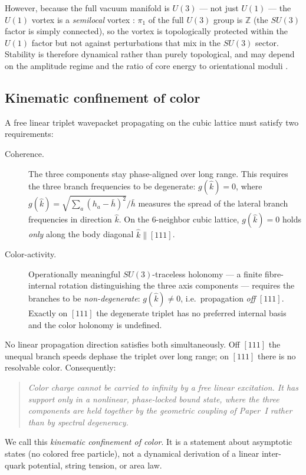 However, because the full vacuum manifold is $U(3)$ --- not just $U(1)$ --- the $U(1)$ vortex is a
\emph{semilocal} vortex \citep{VachaspatiAchucarro1991Semilocal,AchucarroVachaspati2000}: $\pi_1$ of
the full $U(3)$ group is $\mathbb{Z}$ (the $SU(3)$ factor is simply connected), so the vortex is
topologically protected within the $U(1)$ factor but not against perturbations that mix in the $SU(3)$
sector.
Stability is therefore dynamical rather than purely topological, and may depend on the amplitude regime
and the ratio of core energy to orientational moduli
\citep{AuzziBolognesiEvslinKonishiYung2003,Eto2021OrientationalModuli}.

\subsection{Kinematic confinement of color}
\label{subsec:color-confinement}

A free linear triplet wavepacket propagating on the cubic lattice must satisfy two requirements:
\begin{description}
  \item[\normalfont Coherence.] The three components stay phase-aligned over long range.
  This requires the three branch frequencies to be degenerate: $g(\hat k)=0$, where
  $g(\hat k)=\sqrt{\sum_a(h_a-\bar h)^2}/\bar h$ measures the spread of the lateral branch
  frequencies in direction $\hat k$.
  On the 6-neighbor cubic lattice, $g(\hat k)=0$ holds \emph{only} along the body diagonal
  $\hat k\parallel[111]$.

  \item[\normalfont Color-activity.] Operationally meaningful $SU(3)$-traceless holonomy ---
  a finite fibre-internal rotation distinguishing the three axis components --- requires the branches
  to be \emph{non-degenerate}: $g(\hat k)\neq 0$, i.e.\ propagation \emph{off} $[111]$.
  Exactly on $[111]$ the degenerate triplet has no preferred internal basis and the color holonomy is
  undefined.
\end{description}

No linear propagation direction satisfies both simultaneously.
Off $[111]$ the unequal branch speeds dephase the triplet over long range; on $[111]$ there is no
resolvable color.
Consequently:
\begin{quote}
  \emph{Color charge cannot be carried to infinity by a free linear excitation.
  It has support only in a nonlinear, phase-locked bound state, where the three components are held
  together by the geometric coupling of Paper~I rather than by spectral degeneracy.}
\end{quote}
We call this \emph{kinematic confinement of color}.
It is a statement about asymptotic states (no colored free particle), not a dynamical derivation of a
linear inter-quark potential, string tension, or area law.

